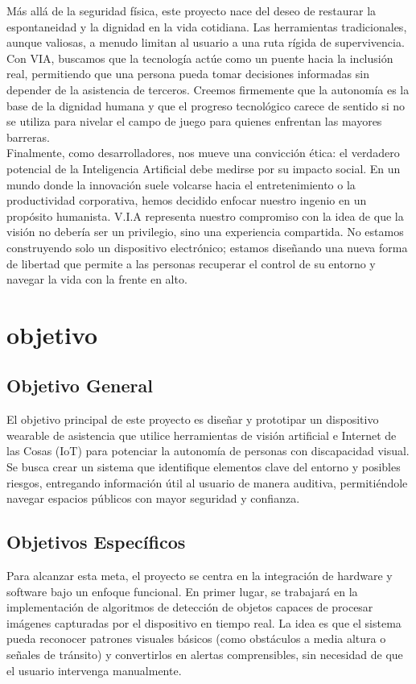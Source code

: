\documentclass{article}
\begin{document}
Más allá de la seguridad física, este proyecto nace del deseo de restaurar la espontaneidad y la dignidad en la vida cotidiana. Las herramientas tradicionales, aunque valiosas, a menudo limitan al usuario a una ruta rígida de supervivencia. Con VIA, buscamos que la tecnología actúe como un puente hacia la inclusión real, permitiendo que una persona pueda tomar decisiones informadas sin depender de la asistencia de terceros. Creemos firmemente que la autonomía es la base de la dignidad humana y que el progreso tecnológico carece de sentido si no se utiliza para nivelar el campo de juego para quienes enfrentan las mayores barreras. \\

Finalmente, como desarrolladores, nos mueve una convicción ética: el verdadero potencial de la Inteligencia Artificial debe medirse por su impacto social. En un mundo donde la innovación suele volcarse hacia el entretenimiento o la productividad corporativa, hemos decidido enfocar nuestro ingenio en un propósito humanista. V.I.A representa nuestro compromiso con la idea de que la visión no debería ser un privilegio, sino una experiencia compartida. No estamos construyendo solo un dispositivo electrónico; estamos diseñando una nueva forma de libertad que permite a las personas recuperar el control de su entorno y navegar la vida con la frente en alto.


    \newpage
    \section{objetivo}
    \subsection{Objetivo General}
El objetivo principal de este proyecto es diseñar y prototipar un dispositivo wearable de asistencia que utilice herramientas de visión artificial e Internet de las Cosas (IoT) para potenciar la autonomía de personas con discapacidad visual. Se busca crear un sistema que identifique elementos clave del entorno y posibles riesgos, entregando información útil al usuario de manera auditiva, permitiéndole navegar espacios públicos con mayor seguridad y confianza.

\subsection{Objetivos Específicos}
Para alcanzar esta meta, el proyecto se centra en la integración de hardware y software bajo un enfoque funcional. En primer lugar, se trabajará en la implementación de algoritmos de detección de objetos capaces de procesar imágenes capturadas por el dispositivo en tiempo real. La idea es que el sistema pueda reconocer patrones visuales básicos (como obstáculos a media altura o señales de tránsito) y convertirlos en alertas comprensibles, sin necesidad de que el usuario intervenga manualmente.
\end{document}
